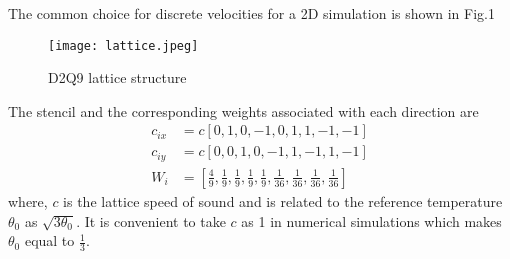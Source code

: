 \documentclass[titlepage,a4paper,10pt]{article}
\begin{document}
The common choice for discrete velocities for a 2D simulation is shown in Fig.1
\begin{figure}[H]
\centering
\texttt{[image: lattice.jpeg]}
\caption{D2Q9 lattice structure\cite{1}}
\label{overflow}
\end{figure}
The stencil and the corresponding weights associated with each direction are
\begin{equation}
\begin{aligned}
c_{ix} &= c\left[0,1,0,-1,0,1,1,-1,-1\right] \\
c_{iy} &= c\left[0,0,1,0,-1,1,-1,1,-1\right] \\
W_i &= \left[\frac{4}{9},\frac{1}{9},\frac{1}{9},\frac{1}{9},\frac{1}{9},\frac{1}{36},\frac{1}{36},\frac{1}{36},\frac{1}{36}\right] 
\end{aligned}
\end{equation}
where, $c$ is the lattice speed of sound and is related to the reference temperature $\theta_0$ as $\sqrt{3\theta_0}$. It is convenient to take $c$ as 1 in numerical simulations which makes $\theta_0$ equal to $\frac{1}{3}$.
\end{document}
